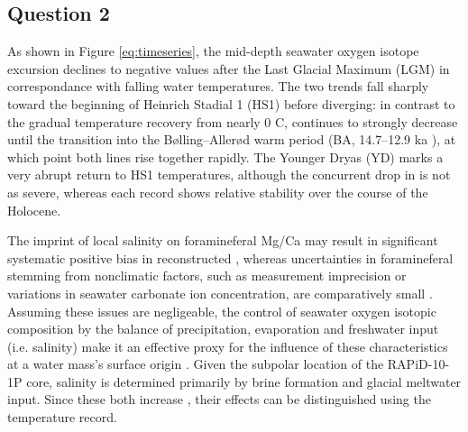 \subsection{Question 2}
As shown in Figure \ref{eq:timeseries}, the mid-depth seawater oxygen isotope excursion  declines to negative values after the Last Glacial Maximum (LGM) in correspondance with falling water temperatures.
The two trends fall sharply toward the beginning of Heinrich Stadial 1 (HS1) before diverging: in contrast to the gradual temperature recovery from nearly 0 \degree{}C,  continues to strongly decrease until the transition into the Bølling–Allerød warm period (BA, 14.7–12.9 ka \parencite{thornalley2011reconstructing}), at which point both lines rise together rapidly.
The Younger Dryas (YD) marks a very abrupt return to HS1 temperatures, although the concurrent drop in  is not as severe, whereas each record shows relative stability over the course of the Holocene.

The imprint of local salinity on foramineferal Mg/Ca may result in significant systematic positive bias in reconstructed  \parencite{mathien2009salinity}, whereas uncertainties in foramineferal  stemming from nonclimatic factors, such as measurement imprecision or variations in seawater carbonate ion concentration, are comparatively small \parencite{bell2014local}. 
Assuming these issues are negligeable, the control of seawater oxygen isotopic composition by the balance of precipitation, evaporation and freshwater input (i.e. salinity) make it an effective proxy for the influence of these characteristics at a water mass's surface origin \parencite{ravelo2007use, lynch2014tracers}.
Given the subpolar location of the RAPiD-10-1P core, salinity is determined primarily by brine formation and glacial meltwater input.
Since these both increase , their effects can be distinguished using the temperature record. 






